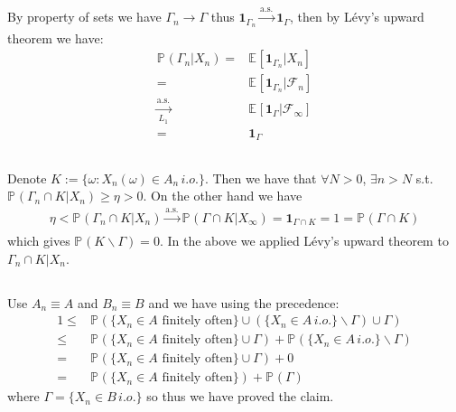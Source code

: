\documentclass[11pt,a4paper]{ctexart}
\numberwithin{equation}{section}%
\newcommand{\F}{\mathcal{F}}
\begin{document}
\subsection{}

By property of sets we have $ \Gamma _n \to \Gamma  $ thus $ \mathbf{1}_{\Gamma _n} \xrightarrow[]{\mathrm{a.s.}}  \mathbf{1}_{\Gamma } $, then by L\'evy's upward theorem we have:
\begin{align*}
    \mathbb{P}_{  }\left( \Gamma _n  |X_n \right)  = & \mathbb{E}_{  }\left[ \mathbf{1}_{\Gamma _n} | X_n \right]\\
    =&  \mathbb{E}_{  }\left[ \mathbf{1}_{\Gamma _n} | \F_n \right] \\
    \xrightarrow[L_1]{\mathrm{a.s.}} & \mathbb{E}_{  }\left[ \mathbf{1}_{\Gamma } | \F_\infty \right] \\
    =& \mathbf{1}_{\Gamma }
\end{align*}


\subsection{}

Denote $ K:= \{\omega : X_n(\omega ) \in A_n \, i.o. \} $. Then we have that $ \forall N >0 $, $ \exists n>N $ s.t. $ \mathbb{P}_{  }\left( \Gamma _n \cap K | X_n  \right) \geq \eta >0 $. On the other hand we have
\begin{align*}
    \eta < \mathbb{P}_{  }\left( \Gamma _n \cap K | X_n \right) \xrightarrow[]{\mathrm{a.s.}} \mathbb{P}_{  }\left( \Gamma \cap K | X_{\infty} \right) = \mathbf{1}_{\Gamma \cap K} = 1 = \mathbb{P}_{  }\left( \Gamma \cap K \right) 
\end{align*}
which gives $ \mathbb{P}_{  }\left( K \backslash \Gamma  \right) =0 $. In the above we applied L\'evy's upward theorem to $ \Gamma_n \cap K | X_n $.


\subsection{}

Use $ A_n \equiv A $ and $ B_n \equiv B $ and we have using the precedence:
\begin{align*}
    1 \leq & \mathbb{P}_{  }\left( \{X_n \in A \text{ finitely often} \} \cup (\{X_n \in A \,i.o. \}\backslash \Gamma ) \cup \Gamma   \right)\\
    \leq& \mathbb{P}_{  }\left( \{X_n \in A \text{ finitely often} \} \cup \Gamma   \right) + \mathbb{P}_{  }\left( \{X_n \in A \,i.o. \}\backslash \Gamma   \right)\\
    =& \mathbb{P}_{  }\left( \{X_n \in A \text{ finitely often} \} \cup \Gamma   \right) + 0\\
    =& \mathbb{P}_{  }\left( \{X_n \in A \text{ finitely often} \} \right) + \mathbb{P}_{  }\left( \Gamma   \right)
\end{align*}
where $ \Gamma =\{ X_n\in B \,i.o.\} $ so thus we have proved the claim.
\end{document}
